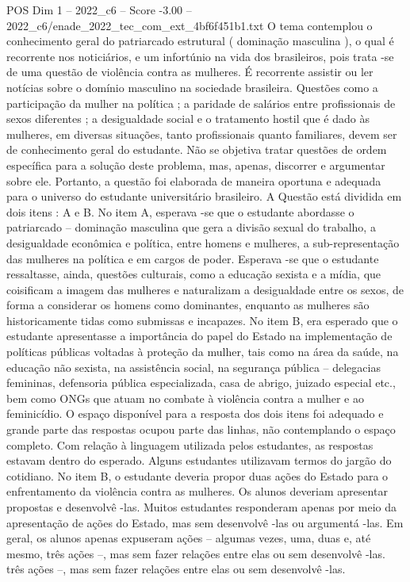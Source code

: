 \begin{textsample}{POS Dim 1 – 2022\_c6 – Score -3.00 – 2022\_c6/enade\_2022\_tec\_com\_ext\_4bf6f451b1.txt}
O tema contemplou o conhecimento geral do patriarcado estrutural ( dominação masculina ), o qual é recorrente nos noticiários, e um infortúnio na vida dos brasileiros, pois trata -se de uma questão de violência contra as mulheres.
É recorrente assistir ou ler notícias sobre o domínio masculino na sociedade brasileira.
Questões como a participação da mulher na política ; a paridade de salários entre profissionais de sexos diferentes ; a desigualdade social e o tratamento hostil que é dado às mulheres, em diversas situações, tanto profissionais quanto familiares, devem ser de conhecimento geral do estudante.
Não se objetiva tratar questões de ordem específica para a solução deste problema, mas, apenas, discorrer e argumentar sobre ele.
Portanto, a questão foi elaborada de maneira oportuna e adequada para o universo do estudante universitário brasileiro.
A Questão está dividida em dois itens : A e B.
No item A, esperava -se que o estudante abordasse o patriarcado – dominação masculina que gera a divisão sexual do trabalho, a desigualdade econômica e política, entre homens e mulheres, a sub-representação das mulheres na política e em cargos de poder.
Esperava -se que o estudante ressaltasse, ainda, questões culturais, como a educação sexista e a mídia, que coisificam a imagem das mulheres e naturalizam a desigualdade entre os sexos, de forma a considerar os homens como dominantes, enquanto as mulheres são historicamente tidas como submissas e incapazes.
No item B, era esperado que o estudante apresentasse a importância do papel do Estado na implementação de políticas públicas voltadas à proteção da mulher, tais como na área da saúde, na educação não sexista, na assistência social, na segurança pública – delegacias femininas, defensoria pública especializada, casa de abrigo, juizado especial etc., bem como ONGs que atuam no combate à violência contra a mulher e ao feminicídio.
O espaço disponível para a resposta dos dois itens foi adequado e grande parte das respostas ocupou parte das linhas, não contemplando o espaço completo.
Com relação à linguagem utilizada pelos estudantes, as respostas estavam dentro do esperado.
Alguns estudantes utilizavam termos do jargão do cotidiano.
No item B, o estudante deveria propor duas ações do Estado para o enfrentamento da violência contra as mulheres.
Os alunos deveriam apresentar propostas e desenvolvê -las.
Muitos estudantes responderam apenas por meio da apresentação de ações do Estado, mas sem desenvolvê -las ou argumentá -las.
Em geral, os alunos apenas expuseram ações – algumas vezes, uma, duas e, até mesmo, três ações –, mas sem fazer relações entre elas ou sem desenvolvê -las. três ações –, mas sem fazer relações entre elas ou sem desenvolvê -las.

\end{textsample}
